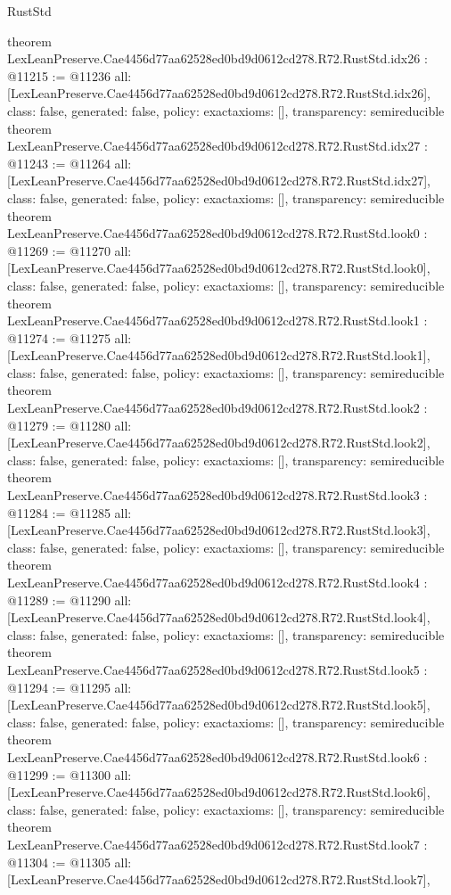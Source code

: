 \begin{lexlean}{RustStd}
\begin{coremodule}
{}
theorem LexLeanPreserve.Cae4456d77aa62528ed0bd9d0612cd278.R72.RustStd.idx26 : @11215 := @11236 {
  all: [LexLeanPreserve.Cae4456d77aa62528ed0bd9d0612cd278.R72.RustStd.idx26],
  class: false,
  generated: false,
  policy: exact{axioms: []},
  transparency: semireducible
}
theorem LexLeanPreserve.Cae4456d77aa62528ed0bd9d0612cd278.R72.RustStd.idx27 : @11243 := @11264 {
  all: [LexLeanPreserve.Cae4456d77aa62528ed0bd9d0612cd278.R72.RustStd.idx27],
  class: false,
  generated: false,
  policy: exact{axioms: []},
  transparency: semireducible
}
theorem LexLeanPreserve.Cae4456d77aa62528ed0bd9d0612cd278.R72.RustStd.look0 : @11269 := @11270 {
  all: [LexLeanPreserve.Cae4456d77aa62528ed0bd9d0612cd278.R72.RustStd.look0],
  class: false,
  generated: false,
  policy: exact{axioms: []},
  transparency: semireducible
}
theorem LexLeanPreserve.Cae4456d77aa62528ed0bd9d0612cd278.R72.RustStd.look1 : @11274 := @11275 {
  all: [LexLeanPreserve.Cae4456d77aa62528ed0bd9d0612cd278.R72.RustStd.look1],
  class: false,
  generated: false,
  policy: exact{axioms: []},
  transparency: semireducible
}
theorem LexLeanPreserve.Cae4456d77aa62528ed0bd9d0612cd278.R72.RustStd.look2 : @11279 := @11280 {
  all: [LexLeanPreserve.Cae4456d77aa62528ed0bd9d0612cd278.R72.RustStd.look2],
  class: false,
  generated: false,
  policy: exact{axioms: []},
  transparency: semireducible
}
theorem LexLeanPreserve.Cae4456d77aa62528ed0bd9d0612cd278.R72.RustStd.look3 : @11284 := @11285 {
  all: [LexLeanPreserve.Cae4456d77aa62528ed0bd9d0612cd278.R72.RustStd.look3],
  class: false,
  generated: false,
  policy: exact{axioms: []},
  transparency: semireducible
}
theorem LexLeanPreserve.Cae4456d77aa62528ed0bd9d0612cd278.R72.RustStd.look4 : @11289 := @11290 {
  all: [LexLeanPreserve.Cae4456d77aa62528ed0bd9d0612cd278.R72.RustStd.look4],
  class: false,
  generated: false,
  policy: exact{axioms: []},
  transparency: semireducible
}
theorem LexLeanPreserve.Cae4456d77aa62528ed0bd9d0612cd278.R72.RustStd.look5 : @11294 := @11295 {
  all: [LexLeanPreserve.Cae4456d77aa62528ed0bd9d0612cd278.R72.RustStd.look5],
  class: false,
  generated: false,
  policy: exact{axioms: []},
  transparency: semireducible
}
theorem LexLeanPreserve.Cae4456d77aa62528ed0bd9d0612cd278.R72.RustStd.look6 : @11299 := @11300 {
  all: [LexLeanPreserve.Cae4456d77aa62528ed0bd9d0612cd278.R72.RustStd.look6],
  class: false,
  generated: false,
  policy: exact{axioms: []},
  transparency: semireducible
}
theorem LexLeanPreserve.Cae4456d77aa62528ed0bd9d0612cd278.R72.RustStd.look7 : @11304 := @11305 {
  all: [LexLeanPreserve.Cae4456d77aa62528ed0bd9d0612cd278.R72.RustStd.look7],
}
\end{coremodule}
\end{lexlean}
